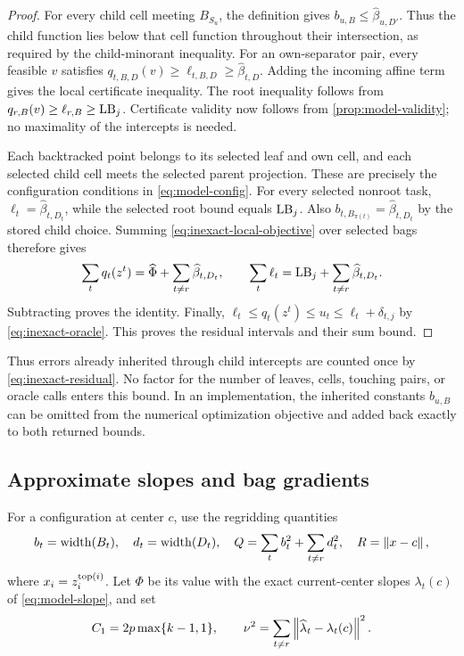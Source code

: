 \begin{proof}
For every child cell meeting $B_{S_u}$, the definition gives
$b_{u,B}\le\widehat\beta_{u,D'}$.  Thus the child function lies below
that cell function throughout their intersection, as required by the
child-minorant inequality.  For an own-separator pair, every feasible
$v$ satisfies
$q_{t,B,D}(v)\ge\ell_{t,B,D}\ge\widehat\beta_{t,D}$.
Adding the incoming affine term gives the local certificate inequality.
The root inequality follows from $q_{r,B}(v)\ge\ell_{r,B}\ge\mathrm{LB}_j$.
Certificate validity now follows from \cref{prop:model-validity}; no
maximality of the intercepts is needed.

Each backtracked point belongs to its selected leaf and own cell, and
each selected child cell meets the selected parent projection.  These
are precisely the configuration conditions in \eqref{eq:model-config}.
For every selected nonroot task,
$\ell_t=\widehat\beta_{t,D_t}$, while the selected root bound equals
$\mathrm{LB}_j$.  Also $b_{t,B_{\pi(t)}}
=\widehat\beta_{t,D_t}$ by the stored child choice.  Summing
\eqref{eq:inexact-local-objective} over selected bags therefore gives
\[
 \sum_t q_t(z^t)=\widehat\Phi+\sum_{t\ne r}\widehat\beta_{t,D_t},
 \qquad
 \sum_t\ell_t=\mathrm{LB}_j+\sum_{t\ne r}\widehat\beta_{t,D_t}.
\]
Subtracting proves the identity.  Finally,
$\ell_t\le q_t(z^t)\le u_t\le\ell_t+\delta_{t,j}$ by
\eqref{eq:inexact-oracle}.  This proves the residual intervals and their
sum bound.
\end{proof}

Thus errors already inherited through child intercepts are counted once
by \eqref{eq:inexact-residual}.  No factor for the number of leaves,
cells, touching pairs, or oracle calls enters this bound.  In an
implementation, the inherited constants $b_{u,B}$ can be omitted from
the numerical optimization objective and added back exactly to both
returned bounds.

\subsection{Approximate slopes and bag gradients}

For a configuration at center $c$, use the regridding quantities
\[
 b_t=\operatorname{width}(B_t),\quad d_t=\operatorname{width}(D_t),\quad
 Q=\sum_t b_t^2+\sum_{t\ne r}d_t^2,\quad R=\left\lVert x-c\right\rVert,
\]
where $x_i=z_i^{\operatorname{top}(i)}$.  Let $\Phi$ be its value with the exact
current-center slopes $\lambda_t(c)$ of \eqref{eq:model-slope}, and set
\[
 C_1=2p\max\{k-1,1\},\qquad
 \nu^2=\sum_{t\ne r}\left\lVert \widehat\lambda_t-\lambda_t(c)\right\rVert^2.
\]

